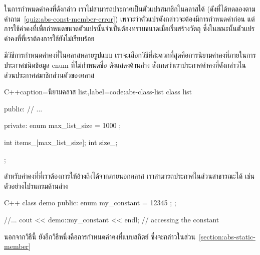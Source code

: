 ใน{\wbr}การ{\wbr}กำหนด{\wbr}ค่าคงที่{\wbr}ดังกล่าว เรา{\wbr}ไม่{\wbr}สามารถ{\wbr}ประกาศ{\wbr}เป็น{\wbr}ตัวแปร{\wbr}สมาชิก{\wbr}ใน{\wbr}ค{\wbr}ลา{\wbr}ส{\wbr}ได้{\wbr}
(ดังที่{\wbr}ได้{\wbr}ทดลอง{\wbr}ตาม{\wbr}คำถาม~\ref{quiz:abs-const-member-error})
เพราะว่า{\wbr}ตัวแปร{\wbr}ดังกล่าว{\wbr}จะ{\wbr}ต้อง{\wbr}มี{\wbr}การ{\wbr}กำหนด{\wbr}ค่า{\wbr}ก่อน{\wbr}
แต่{\wbr}การ{\wbr}ใช้{\wbr}ค่าคงที่{\wbr}เพื่อ{\wbr}กำหนด{\wbr}ขนาด{\wbr}ตัวแปร{\wbr}นั้น{\wbr}จำเป็น{\wbr}ต้อง{\wbr}ทราบ{\wbr}ขนาด{\wbr}เมื่อ{\wbr}เริ่ม{\wbr}สร้าง{\wbr}วัตถุ{\wbr}
ซึ่ง{\wbr}ใน{\wbr}ขณะนั้น{\wbr}ตัวแปร{\wbr}ค่าคงที่{\wbr}ที่{\wbr}เรา{\wbr}ต้องการ{\wbr}ใช้{\wbr}ยัง{\wbr}ไม่{\wbr}เรียบร้อย{\wbr}

มี{\wbr}วิธีการ{\wbr}กำหนด{\wbr}ค่าคงที่{\wbr}ใน{\wbr}ค{\wbr}ลา{\wbr}ส{\wbr}หลาย{\wbr}รูปแบบ{\wbr}
เรา{\wbr}จะ{\wbr}เลือก{\wbr}วิธี{\wbr}ที่{\wbr}สะดวก{\wbr}ที่สุด{\wbr}คือ{\wbr}การ{\wbr}นิยาม{\wbr}ค่าคงที่{\wbr}ภายใน{\wbr}การ{\wbr}ประกาศ{\wbr}ชนิด{\wbr}ข้อมูล {\ct enum}
ที่{\wbr}ไม่{\wbr}กำหนด{\wbr}ชื่อ ดัง{\wbr}แสดง{\wbr}ด้าน{\wbr}ล่าง{\wbr}
สังเกต{\wbr}ว่า{\wbr}เรา{\wbr}ประกาศ{\wbr}ค่าคงที่{\wbr}ดังกล่าว{\wbr}ใน{\wbr}ส่วน{\wbr}ประกาศ{\wbr}สมาชิก{\wbr}ส่วนตัว{\wbr}ของ{\wbr}ค{\wbr}ลา{\wbr}ส

\latintext
\begin{codelist}{C++}{caption={\thaitext นิยาม{\wbr}ค{\wbr}ลา{\wbr}ส {\ct list}\latintext},label=code:abs-class-list}
class list {
public:
  // ...

private:
  enum { max_list_size = 1000 };

  int items_[max_list_size];
  int size_;
};
\end{codelist}
\thaitext

สำหรับ{\wbr}ค่าคงที่{\wbr}ที่{\wbr}เรา{\wbr}ต้องการ{\wbr}ให้{\wbr}อ้าง{\wbr}ถึง{\wbr}ได้{\wbr}จาก{\wbr}ภายนอก{\wbr}ค{\wbr}ลา{\wbr}ส
เรา{\wbr}สามารถ{\wbr}ประกาศ{\wbr}ใน{\wbr}ส่วน{\wbr}สาธารณะ{\wbr}ได้ เช่น{\wbr}ตัวอย่าง{\wbr}โปรแกรม{\wbr}ด้าน{\wbr}ล่าง{\wbr}

\latintext
\begin{codelist}{C++}{}
class demo {
public:
  enum { my_constant = 12345 };
};

  //...
  cout << demo::my_constant << endl;   // accessing the constant
\end{codelist}
\thaitext

นอกจาก{\wbr}วิธี{\wbr}นี้ ยัง{\wbr}อีก{\wbr}วิธี{\wbr}หนึ่ง{\wbr}คือ{\wbr}การ{\wbr}กำหนด{\wbr}ค่าคงที่{\wbr}แบบ{\wbr}สถิตย์
ซึ่ง{\wbr}จะ{\wbr}กล่าว{\wbr}ใน{\wbr}ส่วน~\ref{section:abs-static-member}


